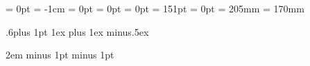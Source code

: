 %
%
\hoffset = 0pt
\voffset = -1cm
\oddsidemargin = 0pt
\oddsidemargin = 0pt
\topmargin = 0pt
\headheight = 151pt
\headsep = 0pt
\textheight = 205mm
\textwidth = 170mm

\parindent 0mm
\parskip .6\baselineskip plus 1pt
%
%
\renewcommand{\bottomfraction}{1}
\renewcommand{\topfraction}{1}
\renewcommand{\textfraction}{0}
\textfloatsep1ex plus 1ex minus.5ex
%
%
\date{}
%
%
\emergencystretch2em
 minus 1pt
 minus 1pt


%
%
%

\newcommand{\halbjahr}{{\bf Summer Semester 2012}}
\newcommand{\studiengangi}{Automotive Systems}
\newcommand{\studiengangii}{}
\newcommand{\studiengangiii}{}
\newcommand{\semesteri}{ASM-SB}
\newcommand{\semesterii}{}
\newcommand{\semesteriii}{}
\newcommand{\fach}{ Reliable Embedded Systems }
\newcommand{\lecture}{{\bf Real Time System Design }}
\newcommand{\fachnummer}{}
\newcommand{\hilfsmittel}{closed book apart from \par 2 manually written sheets of paper DIN-A4}
\newcommand{\dozent}{Friedrich}
\newcommand{\dauer}{60 minutes}

\newlength{\headerspaltenbreite}
\setlength{\headerspaltenbreite}{8.5cm}

